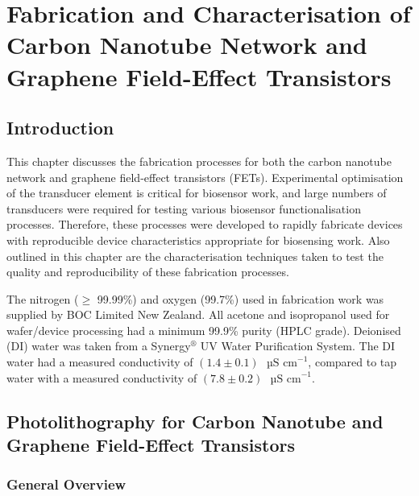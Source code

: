 \documentclass[
  a4paper,
]{scrbook}
\begin{document}

\hypertarget{sec-fabrication}{%
\chapter{Fabrication and Characterisation of Carbon Nanotube Network and
Graphene Field-Effect Transistors}\label{sec-fabrication}}

\hypertarget{introduction-1}{%
\section{Introduction}\label{introduction-1}}

This chapter discusses the fabrication processes for both the carbon
nanotube network and graphene field-effect transistors (FETs).
Experimental optimisation of the transducer element is critical for
biosensor work, and large numbers of transducers were required for
testing various biosensor functionalisation processes. Therefore, these
processes were developed to rapidly fabricate devices with reproducible
device characteristics appropriate for biosensing work. Also outlined in
this chapter are the characterisation techniques taken to test the
quality and reproducibility of these fabrication processes.

The nitrogen (\(\geq\) 99.99\%) and oxygen (99.7\%) used in fabrication
work was supplied by BOC Limited New Zealand. All acetone and
isopropanol used for wafer/device processing had a minimum 99.9\% purity
(HPLC grade). Deionised (DI) water was taken from a
Synergy\(^\circledR\) UV Water Purification System. The DI water had a
measured conductivity of \((1.4\pm0.1)\textrm{ } \textrm{µS cm}^{-1}\),
compared to tap water with a measured conductivity of
\((7.8\pm0.2)\textrm{ } \textrm{µS cm}^{-1}\).

\hypertarget{sec-photolithography}{%
\section{Photolithography for Carbon Nanotube and Graphene Field-Effect
Transistors}\label{sec-photolithography}}

\hypertarget{general-overview}{%
\subsection{General Overview}\label{general-overview}}
\end{document}
